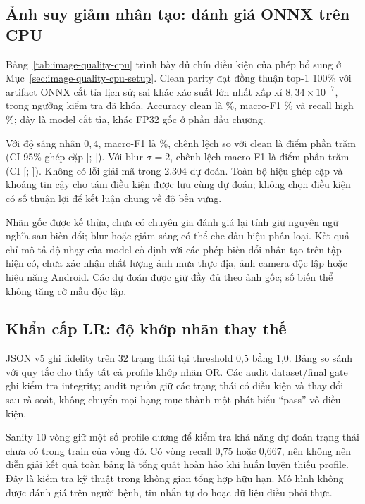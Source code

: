 \subsection{Ảnh suy giảm nhân tạo: đánh giá ONNX trên CPU}\label{sec:image-quality-cpu-results}
Bảng~\ref{tab:image-quality-cpu} trình bày đủ chín điều kiện của phép bổ sung ở Mục~\ref{sec:image-quality-cpu-setup}. Clean parity đạt đồng thuận top-1 100\% với artifact ONNX cắt tỉa lịch sử; sai khác xác suất lớn nhất xấp xỉ $8{,}34\times10^{-7}$, trong ngưỡng kiểm tra đã khóa. Accuracy clean là \QualityCleanAccuracy\%, macro-F1 \QualityCleanMacroFOne\% và recall high \QualityCleanHighRecall\%; đây là model cắt tỉa, khác FP32 gốc ở phần đầu chương.


Với độ sáng nhân $0{,}4$, macro-F1 là \QualityDarkMacroFOne\%, chênh lệch so với clean là \QualityDarkDeltaFOne{} điểm phần trăm (CI 95\% ghép cặp [\QualityDarkCILow; \QualityDarkCIHigh]). Với blur $\sigma=2$, chênh lệch macro-F1 là \QualityBlurDeltaFOne{} điểm phần trăm (CI [\QualityBlurCILow; \QualityBlurCIHigh]). Không có lỗi giải mã trong 2.304 dự đoán. Toàn bộ hiệu ghép cặp và khoảng tin cậy cho tám điều kiện được lưu cùng dự đoán; không chọn điều kiện có số thuận lợi để kết luận chung về độ bền vững.

Nhãn gốc được kế thừa, chưa có chuyên gia đánh giá lại tính giữ nguyên ngữ nghĩa sau biến đổi; blur hoặc giảm sáng có thể che dấu hiệu phân loại. Kết quả chỉ mô tả độ nhạy của model cố định với các phép biến đổi nhân tạo trên tập hiện có, chưa xác nhận chất lượng ảnh mưa thực địa, ảnh camera độc lập hoặc hiệu năng Android. Các dự đoán được giữ đầy đủ theo ảnh gốc; số biến thể không tăng cỡ mẫu độc lập.

\subsection{Khẩn cấp LR: độ khớp nhãn thay thế}
JSON v5 ghi fidelity trên 32 trạng thái tại threshold 0,5 bằng 1,0. Bảng so sánh với quy tắc cho thấy tất cả profile khớp nhãn OR. Các audit dataset/final gate ghi kiểm tra integrity; audit nguồn giữ các trạng thái có điều kiện và thay đổi sau rà soát, không chuyển mọi hạng mục thành một phát biểu ``pass'' vô điều kiện.

Sanity 10 vòng giữ một số profile dương để kiểm tra khả năng dự đoán trạng thái chưa có trong train của vòng đó. Có vòng recall 0,75 hoặc 0,667, nên không nên diễn giải kết quả toàn bảng là tổng quát hoàn hảo khi huấn luyện thiếu profile. Đây là kiểm tra kỹ thuật trong không gian tổng hợp hữu hạn. Mô hình không được đánh giá trên người bệnh, tin nhắn tự do hoặc dữ liệu điều phối thực.

